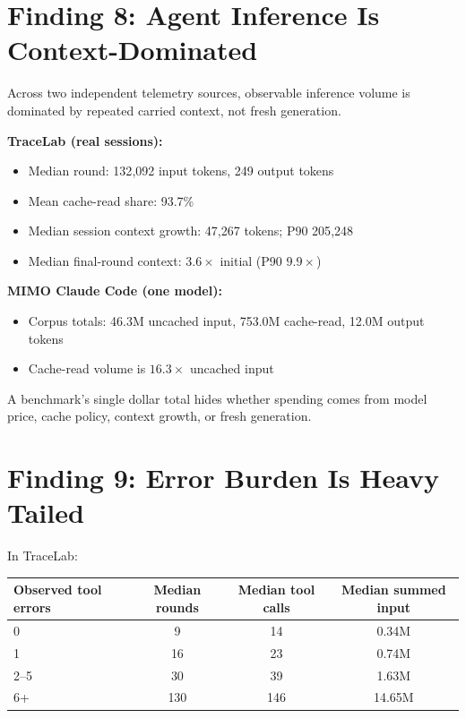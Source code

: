 \documentclass[11pt]{article}
\begin{document}
\section{Finding 8: Agent Inference Is Context-Dominated}

Across two independent telemetry sources, observable inference volume is
dominated by repeated carried context, not fresh generation.

\textbf{TraceLab (real sessions):}
\begin{itemize}[nosep]
\item Median round: 132{,}092 input tokens, 249 output tokens
\item Mean cache-read share: 93.7\%
\item Median session context growth: 47{,}267 tokens; P90 205{,}248
\item Median final-round context: $3.6\times$ initial (P90 $9.9\times$)
\end{itemize}

\textbf{MIMO Claude Code (one model):}
\begin{itemize}[nosep]
\item Corpus totals: 46.3M uncached input, 753.0M cache-read, 12.0M output
  tokens
\item Cache-read volume is $16.3\times$ uncached input
\end{itemize}

A benchmark's single dollar total hides whether spending comes from model
price, cache policy, context growth, or fresh generation.

\section{Finding 9: Error Burden Is Heavy Tailed}

In TraceLab:

\begin{center}
\begin{tabular}{lccc}
\toprule
Observed tool errors & Median rounds & Median tool calls & Median summed input \\
\midrule
0 & 9 & 14 & 0.34M \\
1 & 16 & 23 & 0.74M \\
2--5 & 30 & 39 & 1.63M \\
6+ & 130 & 146 & 14.65M \\
\bottomrule
\end{tabular}
\end{center}
\end{document}
